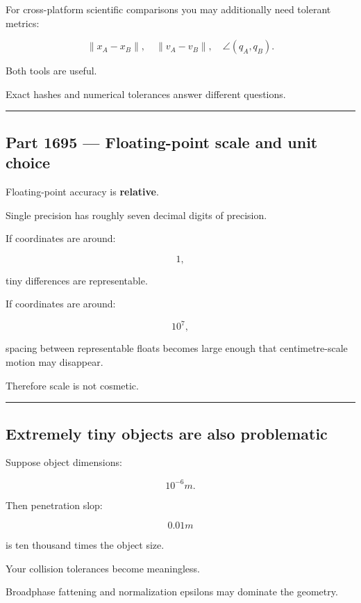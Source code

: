 For cross-platform scientific comparisons you may additionally need tolerant metrics:

\[
\|x_A-x_B\|,
\quad
\|v_A-v_B\|,
\quad
\angle(q_A,q_B).
\]

Both tools are useful.

Exact hashes and numerical tolerances answer different questions.

\begin{center}\rule{0.5\linewidth}{0.5pt}\end{center}

\subsection{Part 1695 --- Floating-point scale and unit choice}\label{06-engine-ii-ch039-part-1695-floating-point-scale-and-unit-choice}

Floating-point accuracy is \textbf{relative}.

Single precision has roughly seven decimal digits of precision.

If coordinates are around:

\[
1,
\]

tiny differences are representable.

If coordinates are around:

\[
10^7,
\]

spacing between representable floats becomes large enough that centimetre-scale motion may disappear.

Therefore scale is not cosmetic.

\begin{center}\rule{0.5\linewidth}{0.5pt}\end{center}

\subsection{Extremely tiny objects are also problematic}\label{06-engine-ii-ch039-extremely-tiny-objects-are-also-problematic}

Suppose object dimensions:

\[
10^{-6}m.
\]

Then penetration slop:

\[
0.01m
\]

is ten thousand times the object size.

Your collision tolerances become meaningless.

Broadphase fattening and normalization epsilons may dominate the geometry.

